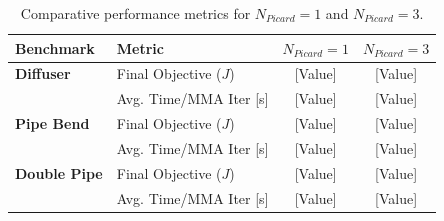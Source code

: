 \begin{table}[htpb]
	\centering
	\caption{Comparative performance metrics for $N_{Picard}=1$ and $N_{Picard}=3$.}
	\label{tab:app_metrics_all}
	\renewcommand{\arraystretch}{1.2}
	\begin{tabular}{llcc}
		\hline
		\textbf{Benchmark} & \textbf{Metric} & \textbf{$N_{Picard}=1$} & \textbf{$N_{Picard}=3$} \\
		\hline
		\textbf{Diffuser} & Final Objective ($J$) & [Value] & [Value] \\
		& Avg. Time/MMA Iter [s] & [Value] & [Value] \\
		\hline
		\textbf{Pipe Bend} & Final Objective ($J$) & [Value] & [Value] \\
		& Avg. Time/MMA Iter [s] & [Value] & [Value] \\
		\hline
		\textbf{Double Pipe} & Final Objective ($J$) & [Value] & [Value] \\
		& Avg. Time/MMA Iter [s] & [Value] & [Value] \\
		\hline
	\end{tabular}
\end{table}